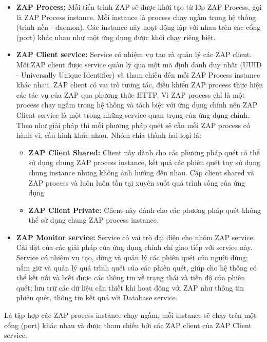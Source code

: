 \begin{itemize}
    \item \textbf{ZAP Process:} Mỗi tiến trình ZAP sẽ được khởi tạo từ lớp ZAP Process, gọi là ZAP Process instance.
          Mỗi instance là process chạy ngầm trong hệ thống (trình nền - daemon).
          Các instance này hoạt động lập với nhau trên các cổng (port) khác nhau như một ứng dụng được khởi chạy riêng biệt.
    \item \textbf{ZAP Client service:} Service có nhiệm vụ tạo và quản lý các ZAP client.
          Mỗi ZAP client được service quản lý qua một mã định danh duy nhất (UUID - Universally Unique Identifier) và tham chiếu đến mỗi ZAP Process instance khác nhau.
          ZAP client có vai trò tương tác, điều khiển ZAP process thực hiện các tác vụ của ZAP qua phương thức HTTP.
          Vì ZAP process chỉ là một process chạy ngầm trong hệ thống và tách biệt với ứng dụng chính nên ZAP Client service là một trong những service quan trọng của ứng dụng chính.
          Theo như giải pháp thì mỗi phương pháp quét sẽ cần mỗi ZAP process có hành vi, cấu hình khác nhau.
          Nhóm chia thành hai loại là:
          \begin{itemize}
              \item \textbf{ZAP Client Shared:} Client này dành cho các phương pháp quét có thể sử dụng chung ZAP process instance, kết quả các phiên quét tuy sử dụng chung instance nhưng không ảnh hưởng đến nhau.
                    Cặp client shared và ZAP process và luôn luôn tồn tại xuyên suốt quá trình sống của ứng dụng
              \item \textbf{ZAP Client Private:} Client này dành cho các phương pháp quét không thể sử dụng chung ZAP process instance.
          \end{itemize}
    \item \textbf{ZAP Monitor service:} Service có vai trò đại diện cho nhóm ZAP service.
          Cài đặt của các giải pháp của ứng dụng chính chỉ giao tiếp với service này.
          Service có nhiệm vụ tạo, dừng và quản lý các phiên quét của người dùng; nắm giữ và quản lý quá trình quét của các phiên quét, giúp cho hệ thống có thể kết nối và biết được các thông tin về trạng thái và tiến độ của phiên quét; lưu trữ các dữ liệu cần thiết khi hoạt động với ZAP như thông tin phiên quét, thông tin kết quả với Database service.
\end{itemize}

\tab \tab Là tập hợp các ZAP process instance chạy ngầm, mỗi instance sẽ chạy trên một cổng (port) khác nhau và được tham chiếu bởi các ZAP client của ZAP Client service.

